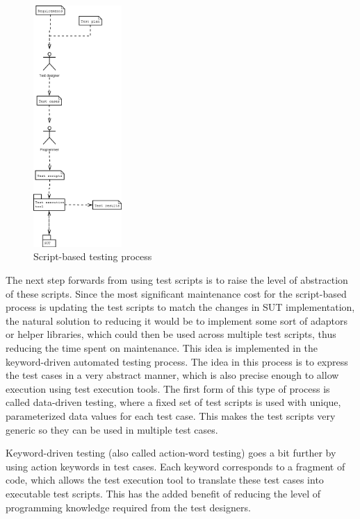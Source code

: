 \begin{figure}[ht]
	\begin{center}
		\includegraphics*[width=0.3\textwidth]{kuvat/TS_process}
	\end{center}
	\caption{Script-based testing process}
	\label{fig:crprocess}
\end{figure}

The next step forwards from using test scripts is to raise the level of abstraction of these scripts. Since the most significant maintenance cost for the script-based process is updating the test scripts to match the changes in SUT implementation, the natural solution to reducing it would be to implement some sort of adaptors or helper libraries, which could then be used across multiple test scripts, thus reducing the time spent on maintenance. This idea is implemented in the keyword-driven automated testing process. The idea in this process is to express the test cases in a very abstract manner, which is also precise enough to allow execution using test execution tools. The first form of this type of process is called data-driven testing, where a fixed set of test scripts is used with unique, parameterized data values for each test case. This makes the test scripts very generic so they can be used in multiple test cases.

Keyword-driven testing (also called action-word testing) goes a bit further by using action keywords in test cases. Each keyword corresponds to a fragment of code, which allows the test execution tool to translate these test cases into executable test scripts. This has the added benefit of reducing the level of programming knowledge required from the test designers. 

